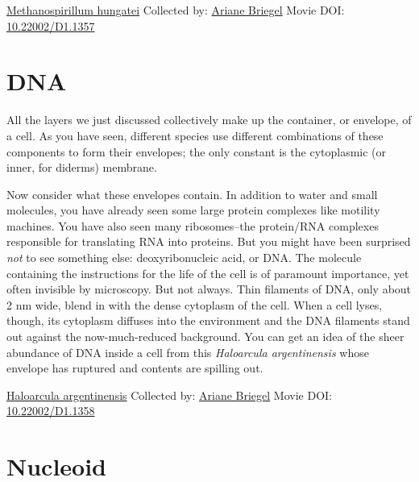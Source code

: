 \documentclass[]{tufte-book}
\begin{document}
\hypertarget{htmlwidget-95bf2dd7787cbeec1b3d}{}

\label{fig:2-8}\protect\hyperlink{tree}{Methanospirillum hungatei} Collected by: \protect\hyperlink{ariane_briegel}{Ariane Briegel} Movie DOI: \href{https://doi.org/10.22002/D1.1357}{10.22002/D1.1357}

\hypertarget{dna}{%
\section{DNA}\label{dna}}

All the layers we just discussed collectively make up the container, or envelope, of a cell. As you have seen, different species use different combinations of these components to form their envelopes; the only constant is the cytoplasmic (or inner, for diderms) membrane.

Now consider what these envelopes contain. In addition to water and small molecules, you have already seen some large protein complexes like motility machines. You have also seen many ribosomes--the protein/RNA complexes responsible for translating RNA into proteins. But you might have been surprised \emph{not} to see something else: deoxyribonucleic acid, or DNA. The molecule containing the instructions for the life of the cell is of paramount importance, yet often invisible by microscopy. But not always. Thin filaments of DNA, only about 2 nm wide, blend in with the dense cytoplasm of the cell. When a cell lyses, though, its cytoplasm diffuses into the environment and the DNA filaments stand out against the now-much-reduced background. You can get an idea of the sheer abundance of DNA inside a cell from this \emph{Haloarcula argentinensis} whose envelope has ruptured and contents are spilling out.



\hypertarget{htmlwidget-871f4150a6852f7ad32b}{}

\label{fig:2-9}\protect\hyperlink{tree}{Haloarcula argentinensis} Collected by: \protect\hyperlink{ariane_briegel}{Ariane Briegel} Movie DOI: \href{https://doi.org/10.22002/D1.1358}{10.22002/D1.1358}

\hypertarget{nucleoid}{%
\section{Nucleoid}\label{nucleoid}}
\end{document}
